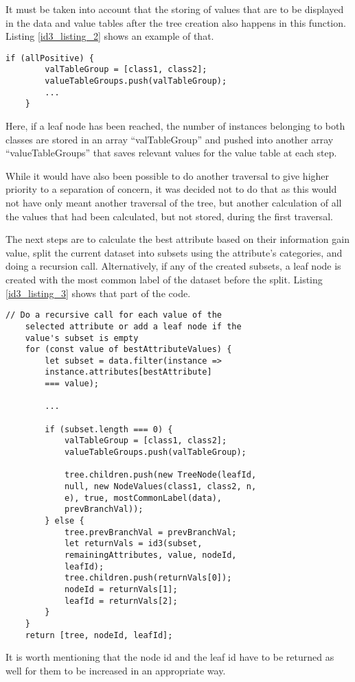 It must be taken into account that the storing of values that are to be displayed in the data and value tables after the tree creation also happens in this function. Listing \ref{id3_listing_2} shows an example of that.
\begin{lstlisting}[caption=Storing of relevant values for the value table]
    if (allPositive) {
        valTableGroup = [class1, class2];
        valueTableGroups.push(valTableGroup);
        ...
    }
\end{lstlisting} \label{id3_listing_2}
Here, if a leaf node has been reached, the number of instances belonging to both classes are stored in an array ``valTableGroup'' and pushed into another array ``valueTableGroups'' that saves relevant values for the value table at each step.

While it would have also been possible to do another traversal to give higher priority to a separation of concern, it was decided not to do that as this would not have only meant another traversal of the tree, but another calculation of all the values that had been calculated, but not stored, during the first traversal.

The next steps are to calculate the best attribute based on their information gain value, split the current dataset into subsets using the attribute's categories, and doing a recursion call.
Alternatively, if any of the created subsets, a leaf node is created with the most common label of the dataset before the split.
Listing \ref{id3_listing_3} shows that part of the code.
\begin{lstlisting}[caption=Recursion call for each subset]
    // Do a recursive call for each value of the
    selected attribute or add a leaf node if the
    value's subset is empty
    for (const value of bestAttributeValues) {
        let subset = data.filter(instance =>
        instance.attributes[bestAttribute]
        === value);

        ...

        if (subset.length === 0) {
            valTableGroup = [class1, class2];
            valueTableGroups.push(valTableGroup);

            tree.children.push(new TreeNode(leafId,
            null, new NodeValues(class1, class2, n,
            e), true, mostCommonLabel(data),
            prevBranchVal));
        } else {
            tree.prevBranchVal = prevBranchVal;
            let returnVals = id3(subset,
            remainingAttributes, value, nodeId,
            leafId);
            tree.children.push(returnVals[0]);
            nodeId = returnVals[1];
            leafId = returnVals[2];
        }
    }
    return [tree, nodeId, leafId];
\end{lstlisting} \label{id3_listing_3}
It is worth mentioning that the node id and the leaf id have to be returned as well for them to be increased in an appropriate way.

